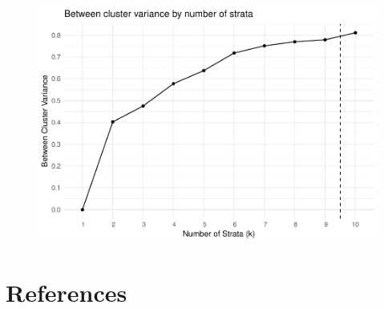 \documentclass[floatsintext,man]{apa6}
\theoremstyle{definition}
\theoremstyle{definition}
\theoremstyle{definition}
\theoremstyle{remark}
\begin{document}
\begin{figure}
\centering
\includegraphics{Method_files/figure-latex/SUBS_FULL_SSB/SST-1.pdf}
\caption{}
\end{figure}

\newpage

\section{References}\label{references}

\begingroup
\setlength{\parindent}{-0.5in} \setlength{\leftskip}{0.5in}

\hypertarget{refs}{}

\endgroup
\end{document}
